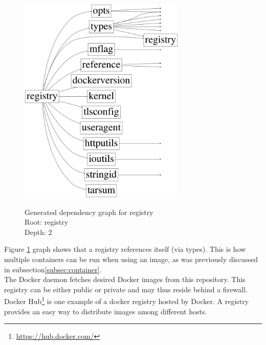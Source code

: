 \begin{figure}[H]
\caption{%
Generated dependency graph for registry\\
Root: registry\\
Depth: 2%
}
\centering
\includegraphics[height=10cm]{images/dependencyGoviz/govizregistryD-2-waybetter.png}
\label{fig:dep:registryd2}
\end{figure}

Figure \ref{fig:dep:registryd2} graph shows that a registry references itself (via types). This is how multiple containers can be run when using an image, as was previously discussed in subsection\ref{subsec:container}.\\
The Docker daemon
fetches desired Docker images from this repository. This registry can be either public or private and may thus reside behind a firewall. Docker
Hub\footnote{\url{https://hub.docker.com/}} is one example of a docker registry
hosted by Docker. A registry provides an easy way to distribute images among different hosts.





